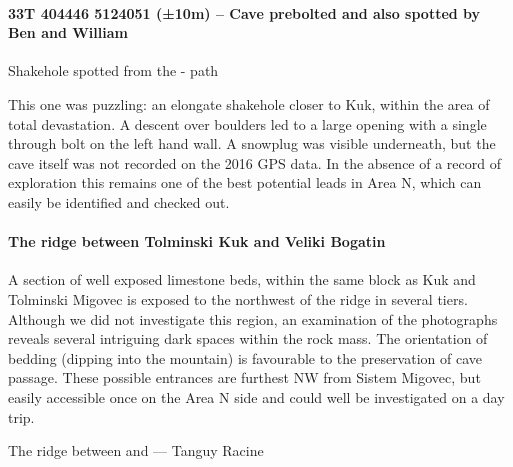 \paragraph{33T 404446 5124051 (±10m) – Cave prebolted and also spotted by Ben and William}

    \begin{marginfigure}
\centering
{} 
 \caption{Shakehole spotted from the  - \protect{} path}\label{shakehole next to kuk}
\end{marginfigure}

This one was puzzling: an elongate shakehole closer to Kuk, within the area of total devastation. A descent over boulders led to a large opening with a single through bolt on the left hand wall. A snowplug was visible underneath, but the cave itself was not recorded on the 2016 GPS data. In the absence of a record of exploration this remains one of the best potential leads in Area N, which can easily be identified and checked out.

\paragraph{The ridge between Tolminski Kuk and Veliki Bogatin}

A section of well exposed limestone beds, within the same block as Kuk and Tolminski Migovec is exposed to the northwest of the ridge in several tiers. Although we did not investigate this region, an examination of the photographs reveals several intriguing dark spaces within the rock mass. The orientation of bedding (dipping into the mountain) is favourable to the preservation of cave passage.  These possible entrances are furthest NW from Sistem Migovec, but easily accessible once on the Area N side and could well be investigated on a day trip.

\begin{pagefigure}
\checkoddpage \ifoddpage \forcerectofloat \else \forceversofloat \fi
    \caption{ The ridge between \protect{} and \protect{} --- Tanguy Racine }
\end{pagefigure}

